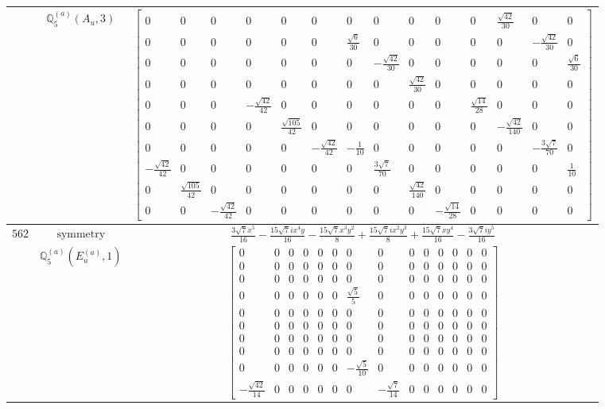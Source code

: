 \documentclass[fleqn,8pt,landscape]{jsarticle}
\begin{document}
\begin{longtable}{ccc}
$  $ & $ \mathbb{Q}_{5}^{(a)}(A_{u},3) $ & $ \begin{bmatrix} 0 & 0 & 0 & 0 & 0 & 0 & 0 & 0 & 0 & 0 & 0 & \frac{\sqrt{42}}{30} & 0 & 0 \\ 0 & 0 & 0 & 0 & 0 & 0 & \frac{\sqrt{6}}{30} & 0 & 0 & 0 & 0 & 0 & - \frac{\sqrt{42}}{30} & 0 \\ 0 & 0 & 0 & 0 & 0 & 0 & 0 & - \frac{\sqrt{42}}{30} & 0 & 0 & 0 & 0 & 0 & \frac{\sqrt{6}}{30} \\ 0 & 0 & 0 & 0 & 0 & 0 & 0 & 0 & \frac{\sqrt{42}}{30} & 0 & 0 & 0 & 0 & 0 \\ 0 & 0 & 0 & - \frac{\sqrt{42}}{42} & 0 & 0 & 0 & 0 & 0 & 0 & \frac{\sqrt{14}}{28} & 0 & 0 & 0 \\ 0 & 0 & 0 & 0 & \frac{\sqrt{105}}{42} & 0 & 0 & 0 & 0 & 0 & 0 & - \frac{\sqrt{42}}{140} & 0 & 0 \\ 0 & 0 & 0 & 0 & 0 & - \frac{\sqrt{42}}{42} & - \frac{1}{10} & 0 & 0 & 0 & 0 & 0 & - \frac{3 \sqrt{7}}{70} & 0 \\ - \frac{\sqrt{42}}{42} & 0 & 0 & 0 & 0 & 0 & 0 & \frac{3 \sqrt{7}}{70} & 0 & 0 & 0 & 0 & 0 & \frac{1}{10} \\ 0 & \frac{\sqrt{105}}{42} & 0 & 0 & 0 & 0 & 0 & 0 & \frac{\sqrt{42}}{140} & 0 & 0 & 0 & 0 & 0 \\ 0 & 0 & - \frac{\sqrt{42}}{42} & 0 & 0 & 0 & 0 & 0 & 0 & - \frac{\sqrt{14}}{28} & 0 & 0 & 0 & 0 \end{bmatrix} $ \\ \hline
$ 562 $ & $ \text{symmetry} $ & $ \frac{3 \sqrt{7} x^{5}}{16} - \frac{15 \sqrt{7} i x^{4} y}{16} - \frac{15 \sqrt{7} x^{3} y^{2}}{8} + \frac{15 \sqrt{7} i x^{2} y^{3}}{8} + \frac{15 \sqrt{7} x y^{4}}{16} - \frac{3 \sqrt{7} i y^{5}}{16} $ \\
$  $ & $ \mathbb{Q}_{5}^{(a)}(E_{u}^{(a)},1) $ & $ \begin{bmatrix} 0 & 0 & 0 & 0 & 0 & 0 & 0 & 0 & 0 & 0 & 0 & 0 & 0 & 0 \\ 0 & 0 & 0 & 0 & 0 & 0 & 0 & 0 & 0 & 0 & 0 & 0 & 0 & 0 \\ 0 & 0 & 0 & 0 & 0 & 0 & 0 & 0 & 0 & 0 & 0 & 0 & 0 & 0 \\ 0 & 0 & 0 & 0 & 0 & 0 & \frac{\sqrt{5}}{5} & 0 & 0 & 0 & 0 & 0 & 0 & 0 \\ 0 & 0 & 0 & 0 & 0 & 0 & 0 & 0 & 0 & 0 & 0 & 0 & 0 & 0 \\ 0 & 0 & 0 & 0 & 0 & 0 & 0 & 0 & 0 & 0 & 0 & 0 & 0 & 0 \\ 0 & 0 & 0 & 0 & 0 & 0 & 0 & 0 & 0 & 0 & 0 & 0 & 0 & 0 \\ 0 & 0 & 0 & 0 & 0 & 0 & 0 & 0 & 0 & 0 & 0 & 0 & 0 & 0 \\ 0 & 0 & 0 & 0 & 0 & 0 & - \frac{\sqrt{5}}{10} & 0 & 0 & 0 & 0 & 0 & 0 & 0 \\ - \frac{\sqrt{42}}{14} & 0 & 0 & 0 & 0 & 0 & 0 & - \frac{\sqrt{7}}{14} & 0 & 0 & 0 & 0 & 0 & 0 \end{bmatrix} $ \\ \hline

\end{longtable}
\end{document}
